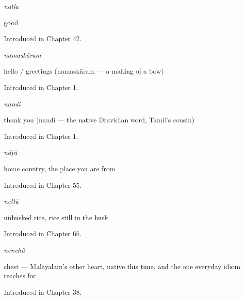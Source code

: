 \noindent\begin{minipage}[t]{\linewidth}
\raggedright
\textbf{}\enspace\emph{nalla}\par
\small good\par
\footnotesize Introduced in Chapter 42.
\end{minipage}\par\medskip

\noindent\begin{minipage}[t]{\linewidth}
\raggedright
\textbf{}\enspace\emph{namaskāram}\par
\small hello / greetings (namaskāram — a making of a bow)\par
\footnotesize Introduced in Chapter 1.
\end{minipage}\par\medskip

\noindent\begin{minipage}[t]{\linewidth}
\raggedright
\textbf{}\enspace\emph{nandi}\par
\small thank you (nandi — the native Dravidian word, Tamil's cousin)\par
\footnotesize Introduced in Chapter 1.
\end{minipage}\par\medskip

\noindent\begin{minipage}[t]{\linewidth}
\raggedright
\textbf{}\enspace\emph{nāṭŭ}\par
\small home country, the place you are from\par
\footnotesize Introduced in Chapter 55.
\end{minipage}\par\medskip

\noindent\begin{minipage}[t]{\linewidth}
\raggedright
\textbf{}\enspace\emph{nellŭ}\par
\small unhusked rice, rice still in the husk\par
\footnotesize Introduced in Chapter 66.
\end{minipage}\par\medskip

\noindent\begin{minipage}[t]{\linewidth}
\raggedright
\textbf{}\enspace\emph{nenchŭ}\par
\small chest — Malayalam's other heart, native this time, and the one everyday idiom reaches for\par
\footnotesize Introduced in Chapter 38.
\end{minipage}\par\medskip

